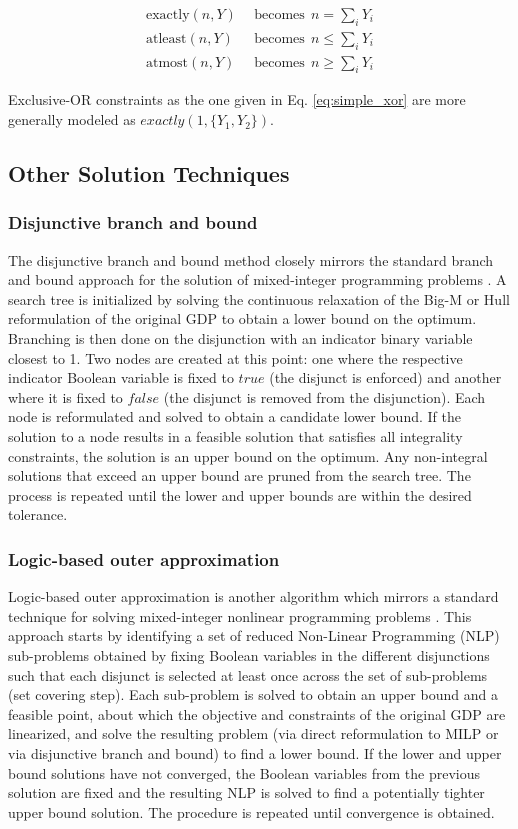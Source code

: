 \documentclass{juliacon}
\begin{document}
\begin{align*}
    \text{exactly}(n, Y) & \ \ \text{becomes} \ \ n = \sum_i Y_i \\
    \text{atleast}(n, Y) &  \ \ \text{becomes} \ \ n \leq \sum_i Y_i \\
    \text{atmost}(n, Y) &  \ \ \text{becomes} \ \ n \geq \sum_i Y_i
\end{align*}

Exclusive-OR constraints as the one given in Eq. \eqref{eq:simple_xor} are more generally modeled as $exactly(1,\{Y_1,Y_2\})$.

\subsection{Other Solution Techniques} \label{other_techniques}

\subsubsection{Disjunctive branch and bound}
The disjunctive branch and bound method closely mirrors the standard branch and bound approach for the solution of mixed-integer programming problems \cite{grossmann_lee_2003}. A search tree is initialized by solving the continuous relaxation of the Big-M or Hull reformulation of the original GDP to obtain a lower bound on the optimum. Branching is then done on the disjunction with an indicator binary variable closest to 1. Two nodes are created at this point: one where the respective indicator Boolean variable is fixed to $true$ (the disjunct is enforced) and another where it is fixed to $false$ (the disjunct is removed from the disjunction). Each node is reformulated and solved to obtain a candidate lower bound. If the solution to a node results in a feasible solution that satisfies all integrality constraints, the solution is an upper bound on the optimum. Any non-integral solutions that exceed an upper bound are pruned from the search tree. The process is repeated until the lower and upper bounds are within the desired tolerance.

\subsubsection{Logic-based outer approximation}
Logic-based outer approximation is another algorithm which mirrors a standard technique for solving mixed-integer nonlinear programming problems \cite{E.Grossmann2009}. This approach starts by identifying a set of reduced Non-Linear Programming (NLP) sub-problems obtained by fixing Boolean variables in the different disjunctions such that each disjunct is selected at least once across the set of sub-problems (set covering step). 
Each sub-problem is solved to obtain an upper bound and a feasible point, about which the objective and constraints of the original GDP are linearized, and solve the resulting problem (via direct reformulation to MILP or via disjunctive branch and bound) to find a lower bound. If the lower and upper bound solutions have not converged, the Boolean variables from the previous solution are fixed and the resulting NLP is solved to find a potentially tighter upper bound solution. The procedure is repeated until convergence is obtained.
\end{document}
